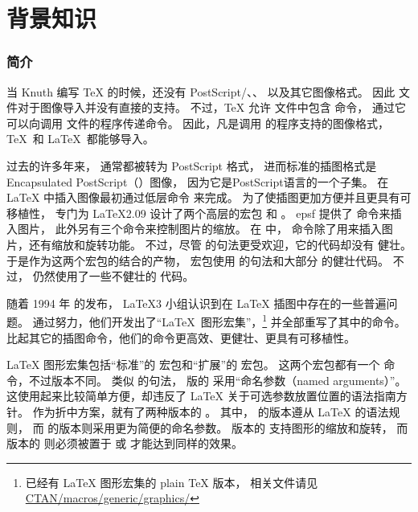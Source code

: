\part{背景知识}

\section{简介}\label{sec:introduction}
当 Knuth 编写 \TeX{} 的时候，还没有 PostScript/、、 以及其它图像格式。
因此  文件对于图像导入并没有直接的支持。
不过，\TeX{} 允许 文件中包含  命令，
通过它可以向调用  文件的程序传递命令。
因此，凡是调用  的程序支持的图像格式，
\TeX\ 和 \LaTeX\ 都能够导入。

过去的许多年来， 通常都被转为 PostScript 格式，
进而标准的插图格式是 Encapsulated PostScript（）图像，
因为它是PostScript语言的一个子集。
在 \LaTeX{} 中插入图像最初通过低层命令  来完成。
为了使插图更加方便并且更具有可移植性，
专门为 \LaTeX 2.09 设计了两个高层的宏包  和 。
\textsf{epsf} 提供了  命令来插入图片，
此外另有三个命令来控制图片的缩放。
在  中， 命令除了用来插入图片，还有缩放和旋转功能。
不过，尽管  的句法更受欢迎，它的代码却没有  健壮。
于是作为这两个宏包的结合的产物，
 宏包使用  的句法和大部分  的健壮代码。
不过， 仍然使用了一些不健壮的  代码。

随着 1994 年 \LaTeXe{} 的发布，
\LaTeX 3 小组认识到在 \LaTeX{} 插图中存在的一些普遍问题。
通过努力，他们开发出了“\LaTeX\ 图形宏集”，\footnote{
    已经有 \LaTeX{} 图形宏集的 plain \TeX{} 版本，
	相关文件请见 \href{ftp://ctan.tug.org/tex-archive/macros/plain/graphics/}{CTAN/macros/generic/graphics/}}
并全部重写了其中的命令。
比起其它的插图命令，他们的命令更高效、更健壮、更具有可移植性。

\LaTeX{} 图形宏集包括“标准”的  宏包和“扩展”的  宏包。
这两个宏包都有一个  命令，不过版本不同。
类似  的句法，
 版的  采用“命名参数（named arguments）”。
这使用起来比较简单方便，却违反了 \LaTeX{} 关于可选参数放置位置的语法指南方针。
作为折中方案，就有了两种版本的 。
其中， 的版本遵从 \LaTeX{} 的语法规则，
而 的版本则采用更为简便的命名参数。
 版本的  支持图形的缩放和旋转，
而  版本的  则必须被置于  或  才能达到同样的效果。

